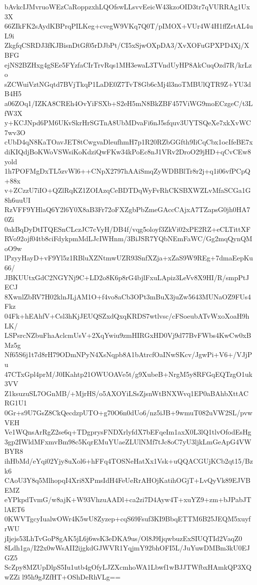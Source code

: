 bAvkcIJMvruoWEzCaRoppzxhLQOfswLLsvvEeicW43kzoOID3tr7qVURRAg1Ux3X
66ZIkFK2sAydKBPrqPILKeg+cvegW9VKq7Q0T/pIMOX+VUr4W4H1ffZrtAL4uL9i
ZkgfqCSRDJ3fKJBisnDtGf05rDJbPt/CI5xSjwOXpDA3/XvXOFuGPXPD4Xj/XBFG
ejNS2BZHxg4gSEe5FYzfaCIrTrvRqs1MH3ewaL3TVndUyHP8AkCuqOzd7R/krLzo
sZCWuiVztNGqtd7BVjTkqP1LaDE0Z7TvT8Gb6cMj4l3noTMBUlQTR9Z+YU3dB4H5
a06ZOq1/IZKA8CREh4OvYiFSXb+S2eH5mN8BkZBF457ViWG9moECzgeC/t3LfW3X
y+KCJNpd6PM6UKvSkrHrSGTnA8UbMDvaFi6nJ5sfquv3UYTSQeXe7xkXvWC7wv3O
cUbD4qN8KaTOavJET8tCwgvaDleufhmH7p1R20RZbGGfth9IiCqCbx1ocIfeBE7x
diKIQdjBoKWoVSWsiKoKdziQwFKw34kPoEc8nJ1VRv2DroO29jHD+qCvCEw8yold
1h7POFMgDxTL5zvWl6++CNpX2797hAAiSmqZyWDBBlTr8r2j+q1i06vfPCpQ+88x
v+ZCzzU7iIO+QZlRqKZ1ZOIAzqCeBDTDqWyFvRhCKSBXWZLvMfaSCGa1G8h6uuUI
RzVFF9YHlaQ6Y2l6Y0X8aB3Fr72oFXZgbPbZmeGAccCAjxA7TZapsG0jh0HA70Zi
0akBqDyDtITQESnCLczJC7cVyH/DB4f/vqg5oloyf3ZkVi02xPE2RZ+eCLTittXF
RVo92ojf04tb8ciFdykpmMdLJcIWHnm/3BiJSR7YQbNEmFaWC/Gg2mqQynQMoO9w
lPzyyHayD+vF9Yl5z1RBluXZNtmwUZR93SnfXZja+xZaS9W9REg+7dmaEepKu66/
JBKUUtxGdC2NGYNj9C+LD2o8K6p8rG4bjlFxuLApiz3LeVv8X9HI/R/smpPtJECJ
8XwnlZbRV7H02klnJLjAM1O+f4vo8aCb3OPt3mBuX3juZw5643MUNaOZ9FUs4Fkz
04Fk+hEAhfV+Csl3hKjJEUQSZxdQxqKRDS7wtlvsc/cFSoeubATvWxoXoaH9hLK/
LSPsrcNZbuFhaAclcmUsV+2XqYwiu9zmHIRGxHD0Vj9d77BvFWbs4KwCw0xBMz5g
Nf65S6j1t7d8rH79ODmNPyN4XsNqpb8A1bAtrcfOaINwSKcv/JgwPi+V6+/VJjPu
47CTxGpl4prM/J0IKahtp21OWUOAVe5t/g9XubeB+NrgM5y8RFGqEQTzgO1uk3VV
Z1ksuzuSL7OGnMB/+MjrHS/o5AXOYiLSsZjsnWtBNXWvq1EP0aBAhbXttACRG1U1
0Gr+s9U7GsZ8CkQecdzpUTO+g70O6n0dUo6/nz5iJB+9wmuT082uVW2SL/pvwVEH
Ve1WQnsArRgZ2se6q+TDgprysFNDXrlyfdX7bEFqeIm1axX0L3lQ1tlvOfodEsHg
3gp2IWldMFxmvBm98c5KqrEMuYUaeZLUlNMf7tJc8oC7yU3ljkLmGeApG4VWBYR8
ihHbMd/eYqi02Yjy8uXol6+hFFq4TOSNeHatXx1Vsk+uQQACGUjKCb2qt15/Bzk6
CAoU3Y8q5MlhopqI4Xri8XPmsIdH4FeUeRrAHOjKatihOGjT+LvQyVk89EJVBEMZ
eYPkpdTvmG/w8ajK+W93VhzuAADl+ca2zi7D4Ayw4T+xuYZ9+zm+bJPabJTlAET6
0KWVTgcyIualwOWr4K5wU8Zyzep+cqS69Fsuf3KI9BbqETTM6B25JEQM5xuyfrWU
jIjejs53LhTvGoP8gAK5jL6j6wsK3eDKA9us/Ol8J9IjqwbuzExSIUQTId2VaqZ0
8Ldh1ga/I22x0wWsAII2ijgkdGJWVR1YqjmY92bhOFI5L/JuYuwDMBm3kU0EJGZ5
ScZpy8MZUpDlpS5Iu1utb4gOfyLJZXcmhoWA1Lbwf1wBJJTWfbxHAmkQP3XQwZZi
l95h9gJZfHT+OShDeRhVLg==
